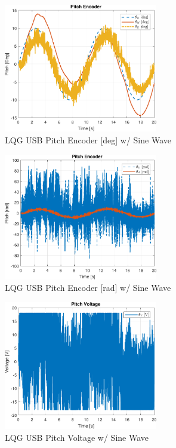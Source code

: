 \documentclass[fontsize=11pt, %
                             paper=letter, %
                             openany, %
                             captions=tableheading,
                             index=totoc,
                             hyperref]{labbook}
\begin{document}
\begin{addmargin}[0cm]{0cm}
\begin{figure}[h]
  \centering
  \includegraphics[width=0.6\textwidth]{figs/matlab/LQG_USB/Pitch_Pos_deg_LQG_USB_SIN}
  \caption{LQG USB Pitch Encoder [deg] w/ Sine Wave}
  \label{fig:Pitch_Pos_deg_LQG_USB_SIN}
\end{figure}

\begin{figure}[h]
  \centering
  \includegraphics[width=0.6\textwidth]{figs/matlab/LQG_USB/Pitch_Pos_Rad_LQG_USB_SIN}
  \caption{LQG USB Pitch Encoder [rad] w/ Sine Wave}
  \label{fig:Pitch_Pos_Rad_LQG_USB_SIN}
\end{figure}

\begin{figure}[h]
  \centering
  \includegraphics[width=0.6\textwidth]{figs/matlab/LQG_USB/Pitch_Volt_LQG_USB_SIN}
  \caption{LQG USB Pitch Voltage w/ Sine Wave}
  \label{fig:Pitch_Volt_LQG_USB_SIN}
\end{figure}


\end{addmargin}
\end{document}
